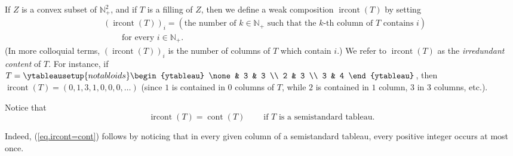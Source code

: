 \documentclass[numbers=enddot,12pt,final,onecolumn,notitlepage]{scrartcl}%
\theoremstyle{definition}
\newenvironment{vershort}{}{}
\begin{document}
If $Z$ is a convex subset of $\mathbb{N}_{+}^{2}$, and if $T$ is a filling of
$Z$, then we define a weak composition $\operatorname*{ircont}\left(
T\right)  $ by setting%
\begin{align*}
&  \left(  \operatorname*{ircont}\left(  T\right)  \right)  _{i}=\left(
\text{the number of }k\in\mathbb{N}_{+}\text{ such that the }k\text{-th column
of }T\text{ contains }i\right) \\
&  \ \ \ \ \ \ \ \ \ \ \text{for every }i\in\mathbb{N}_{+}.
\end{align*}
(In more colloquial terms, $\left(  \operatorname*{ircont}\left(  T\right)
\right)  _{i}$ is the number of columns of $T$ which contain $i$.) We refer to
$\operatorname*{ircont}\left(  T\right)  $ as the \textit{irredundant content}
of $T$. For instance, if $T=%
\ytableausetup{notabloids}
\begin{ytableau}
\none& 3 & 3 \\
2 & 3 \\
3 & 4
\end{ytableau}%
$, then $\operatorname*{ircont}\left(  T\right)  =\left(  0,1,3,1,0,0,0,\ldots
\right)  $ (since $1$ is contained in $0$ columns of $T$, while $2$ is
contained in $1$ column, $3$ in $3$ columns, etc.).

Notice that
\begin{equation}
\operatorname*{ircont}\left(  T\right)  =\operatorname*{cont}\left(  T\right)
\ \ \ \ \ \ \ \ \ \ \text{if }T\text{ is a semistandard tableau.}
\label{eq.ircont=cont}%
\end{equation}


\begin{vershort}
Indeed, (\ref{eq.ircont=cont}) follows by noticing that in every given column
of a semistandard tableau, every positive integer occurs at most once.
\end{vershort}
\end{document}
